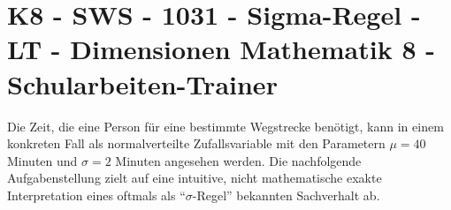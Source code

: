 \section{K8 - SWS - 1031 - Sigma-Regel - LT - Dimensionen Mathematik 8 - Schularbeiten-Trainer}

\begin{beispiel}[K8 - SWS]{1}
Die Zeit, die eine Person für eine bestimmte Wegstrecke benötigt, kann in einem konkreten Fall als normalverteilte Zufallsvariable mit den Parametern $\mu=40$ Minuten und $\sigma=2$ Minuten angesehen werden. Die nachfolgende Aufgabenstellung zielt auf eine intuitive, nicht mathematische exakte Interpretation eines oftmals als "`$\sigma$-Regel"' bekannten Sachverhalt ab.

\end{beispiel}